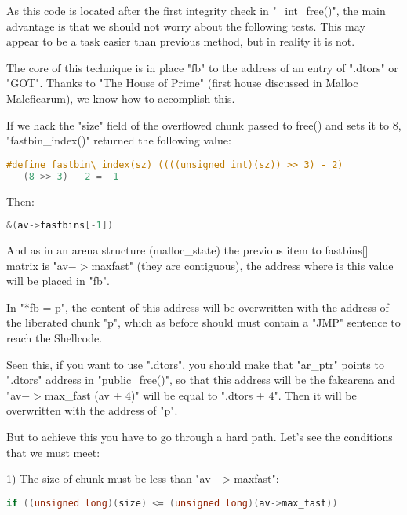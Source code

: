 \documentclass[12pt]{article}
\begin{document}
	
As this code is located after the first integrity check in "\_int\_free()",
the main advantage is that we should not worry about the following tests. 
This may appear to be a task easier than previous method, but in reality
it is not.
\newline

The core of this technique is in place "fb" to the address of an entry of
".dtors" or "GOT". Thanks to "The House of Prime" (first house discussed
in Malloc Maleficarum), we know how to accomplish this.
\newline

If we hack the "size" field of the overflowed chunk passed to free() and
sets it to 8, "fastbin\_index()" returned the following value:

\begin{lstlisting}[language=C]
   #define fastbin\_index(sz) ((((unsigned int)(sz)) >> 3) - 2)
   (8 >> 3) - 2 = -1
\end{lstlisting}

Then:
\begin{lstlisting}[language=C]
   &(av->fastbins[-1])
\end{lstlisting}

And as in an arena structure (malloc\_state) the previous item to
fastbins[] matrix is "av$->$maxfast" (they are contiguous), the address
where is this value will be placed in "fb".
\newline

In "*fb = p", the content of this address will be overwritten with the
address of the liberated chunk "p", which as before should must contain
a "JMP" sentence to reach the Shellcode.
\newline

Seen this, if you want to use ".dtors", you should make that "ar\_ptr"
points to ".dtors" address in "public\_free()", so that this address will
be the fakearena and "av$->$max\_fast (av + 4)" will be equal to ".dtors +
4".  Then it will be overwritten with the address of "p".
\newline

But to achieve this you have to go through a hard path. Let's see the
conditions that we must meet:
\newline

   1) The size of chunk must be less than "av$->$maxfast":
\newline
\begin{lstlisting}[language=C]
   if ((unsigned long)(size) <= (unsigned long)(av->max_fast))
\end{lstlisting}
\end{document}
